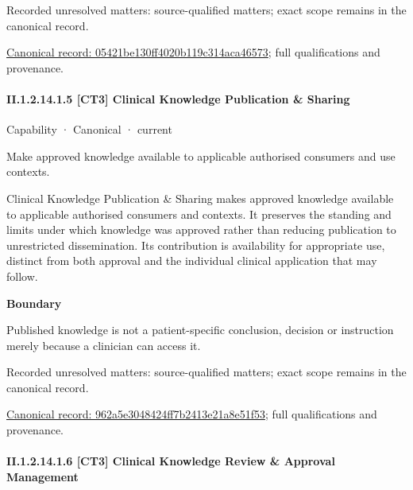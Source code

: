 {\small Recorded unresolved matters: source-qualified matters; exact scope remains in the canonical record.}\par
{\footnotesize \href{../../../../continuum/strategy/capability/05421be130ff4020b119c314aca46573.md}{Canonical record: 05421be130ff4020b119c314aca46573}; full qualifications and provenance.}\par
\paragraph*{II.1.2.14.1.5 [CT3] Clinical Knowledge Publication \& Sharing}
\label{navigation:II.1.2.14.1.5}

\label{element:962a5e3048424ff7b2413e21a8e51f53}
{\small Capability · Canonical · current}\par

Make approved knowledge available to applicable authorised consumers and use contexts.



Clinical Knowledge Publication \& Sharing makes approved knowledge available to applicable authorised consumers and contexts. It preserves the standing and limits under which knowledge was approved rather than reducing publication to unrestricted dissemination. Its contribution is availability for appropriate use, distinct from both approval and the individual clinical application that may follow.



\textbf{Boundary}



Published knowledge is not a patient-specific conclusion, decision or instruction merely because a clinician can access it.


{\small Recorded unresolved matters: source-qualified matters; exact scope remains in the canonical record.}\par
{\footnotesize \href{../../../../continuum/strategy/capability/962a5e3048424ff7b2413e21a8e51f53.md}{Canonical record: 962a5e3048424ff7b2413e21a8e51f53}; full qualifications and provenance.}\par
\paragraph*{II.1.2.14.1.6 [CT3] Clinical Knowledge Review \& Approval Management}
\label{navigation:II.1.2.14.1.6}

